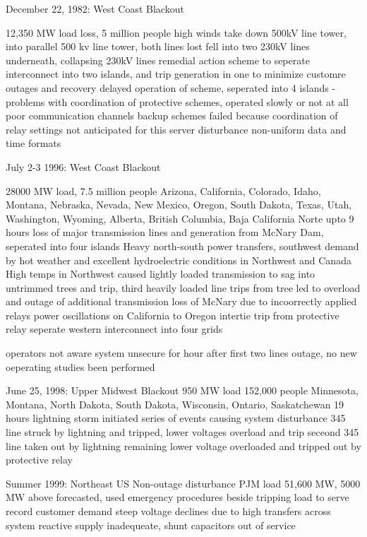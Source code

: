 December 22, 1982: West Coast Blackout

12,350 MW load loss, 5 million people
high winds take down 500kV line tower, into parallel 500 kv line tower, both lines lost
fell into two 230kV lines underneath, collapsing 230kV lines
remedial action scheme to seperate interconnect into two islands, and trip generation in one to minimize customre outages and recovery
delayed operation of scheme, seperated into 4 islands
-problems with coordination of protective schemes, operated slowly or not at all
poor communication channels
backup schemes failed because coordination of relay settings not anticipated for this server disturbance
non-uniform data and time formats

July 2-3 1996: West Coast Blackout

28000 MW load, 7.5 million people
Arizona, California, Colorado, Idaho, Montana, Nebraska, Nevada, New Mexico, Oregon, South Dakota, Texas, Utah,  Washington, Wyoming, Alberta, British Columbia, Baja California Norte
upto 9 hours
loss of major transmission lines and generation from McNary Dam, seperated into four islands
Heavy north-south power transfers, southwest demand by hot weather and excellent hydroelectric conditions in Northwest and Canada
High temps in Northwest caused lightly loaded transmission to sag into untrimmed trees and trip, third heavily loaded line trips from tree
led to overload and outage of additional transmission
loss of McNary due to incoorrectly applied relays
power oscillations on California to Oregon intertie trip from protective relay
seperate western interconnect into four grids

operators not aware system unsecure for hour after first two lines outage, no new oeperating studies been performed

June 25, 1998: Upper Midwest Blackout
950 MW load 152,000 people
Minnesota, Montana, North Dakota, South Dakota, Wisconsin, Ontario, Saskatchewan
19 hours
lightning storm initiated series of events causing system disturbance
345 line struck by lightning and tripped, lower voltages overload and trip
seceond 345 line taken out by lightning
remaining lower voltage overloaded and tripped out by protective relay

Summer 1999: Northeast US Non-outage disturbance
PJM load 51,600 MW, 5000 MW above forecasted, used emergency procedures beside tripping load to serve record customer demand
steep voltage declines due to high transfers across system
reactive supply inadequeate, shunt capacitors out of service


